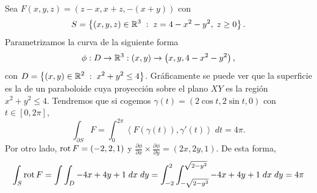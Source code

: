 \begin{eg}
	Sea $\displaystyle F\left(x,y,z\right)=\left(z-x, x + z, -\left(x+y\right)\right) $ con  
	\[ S = \left\{ \left(x,y,z\right)\in \mathbb{R}^{3} \; :\; z = 4-x^{2}-y^{2}, \; z \geq 0\right\}.\]
Parametrizamos la curva de la siguiente forma
\[\phi : D \to \mathbb{R}^{3} : \left(x,y\right) \to \left(x,y,4-x^{2}-y^{2}\right) ,\]
con $\displaystyle D = \left\{ \left(x,y\right) \in \mathbb{R}^{2} \; : \; x^{2}+y^{2}\leq 4\right\}  $. Gráficamente se puede ver que la superficie es la de un paraboloide cuya proyección sobre el plano $\displaystyle XY $ es la región $\displaystyle x^{2}+y^{2} \leq 4 $. Tendremos que si cogemos $\displaystyle \gamma\left(t\right)=\left(2\cos t, 2 \sin t, 0\right) $ con $\displaystyle t \in \left[0,2\pi \right]  $,
\[\int _{\partial S} F= \int^{2\pi }_{0} \left\langle F\left(\gamma\left(t\right)\right), \gamma'\left(t\right) \right\rangle  \; dt = 4\pi  .\]
Por otro lado, $\displaystyle \operatorname{rot} F = \left(-2,2,1\right) $ y $\displaystyle \frac{\partial \phi}{\partial x}\times \frac{\partial \phi}{\partial y}=\left(2x, 2y, 1\right) $. De esta forma, 
\[
\begin{split}
	\int _{S}\operatorname{rot} F = \int \int _{D}-4x + 4y + 1 \; dx \; dy = \int^{2}_{-2} \int^{\sqrt{2-y^{2}}}_{-\sqrt{2-y^{2}}} -4x + 4y + 1 \; dx \; dy = 4\pi 
\end{split}
\]
\end{eg}
